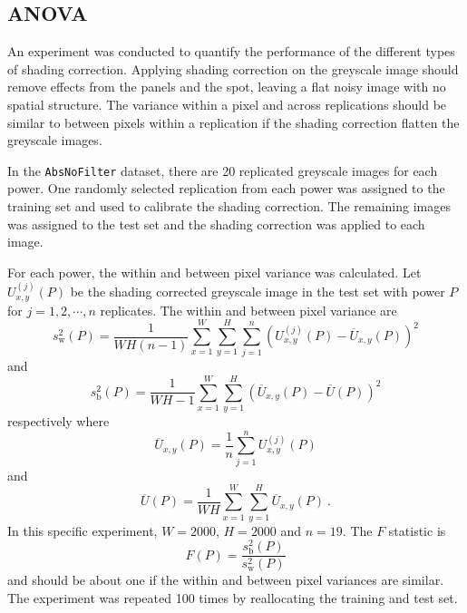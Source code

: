 \subsection{ANOVA}

An experiment was conducted to quantify the performance of the different types of shading correction. Applying shading correction on the greyscale image should remove effects from the panels and the spot, leaving a flat noisy image with no spatial structure. The variance within a pixel and across replications should be similar to between pixels within a replication if the shading correction flatten the greyscale images.

In the \texttt{AbsNoFilter} dataset, there are 20 replicated greyscale images for each power. One randomly selected replication from each power was assigned to the training set and used to calibrate the shading correction. The remaining images was assigned to the test set and the shading correction was applied to each image.

For each power, the within and between pixel variance was calculated. Let $U_{x,y}^{(j)}(P)$ be the shading corrected greyscale image in the test set with power $P$ for $j=1,2,\cdots,n$ replicates. The within and between pixel variance are
\begin{equation}
s_\mathrm{w}^2(P)=\dfrac{1}{WH(n-1)}
  \sum_{x=1}^{W}\sum_{y=1}^{H}\sum_{j=1}^{n}
  \left(
    U_{x,y}^{(j)}(P) - \overline{U}_{x,y}(P)
  \right)^2
\end{equation}
and
\begin{equation}
s_\mathrm{b}^2(P)=\dfrac{1}{WH-1}
  \sum_{x=1}^{W}\sum_{y=1}^{H}
  \left(
    \overline{U}_{x,y}(P) - \overline{U}(P)
  \right)^2
\end{equation}
respectively where
\begin{equation}
  \overline{U}_{x,y}(P) = \dfrac{1}{n}\sum_{j=1}^{n}U_{x,y}^{(j)}(P)
\end{equation}
and
\begin{equation}
  \overline{U}(P) = \dfrac{1}{WH}\sum_{x=1}^{W}\sum_{y=1}^{H}\overline{U}_{x,y}(P)
  \ .
\end{equation}
In this specific experiment, $W=2000$, $H=2000$ and $n=19$. The $F$ statistic is
\begin{equation}
F(P)=\dfrac{s_\mathrm{b}^2(P)}{s_\mathrm{w}^2(P)}
\end{equation}
and should be about one if the within and between pixel variances are similar. The experiment was repeated 100 times by reallocating the training and test set.

